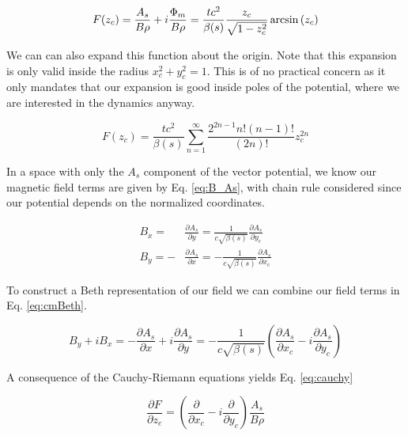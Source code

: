 \begin{equation} \label{eq:genF}
	F(z_c) = \frac{A_s}{B\rho} + i\frac{\Phi_m}{B\rho} = \frac{t c^2}{\beta(s)}\frac{z_c}{\sqrt{1-z_c^2}} \arcsin{(z_c)} \\ 
\end{equation}

We can can also expand this function about the origin. Note that this expansion is only valid inside the radius $x_c^2 + y_c^2 = 1$. This is of no practical concern as it only mandates that our expansion is good inside poles of the potential, where we are interested in the dynamics anyway.

\begin{equation} \label{eq:powF}
	F(z_c) = \frac{t c^2}{\beta(s)} \sum_{n=1}^{\infty} \frac{2^{2n-1}n!(n-1)!}{(2n)!} z_c^{2n}
\end{equation}

In a space with only the $A_s$ component of the vector potential, we know our magnetic field terms are given by Eq. \ref{eq:B_As}, with chain rule considered since our potential depends on the normalized coordinates.

\begin{equation} \label{eq:B_As}
\begin{split}
	B_x = &\frac{\partial A_s}{\partial y} = \frac{1}{c\sqrt{\beta(s)}}\frac{\partial A_s}{\partial y_c}\\
	B_y = -&\frac{\partial A_s}{\partial x} = -\frac{1}{c\sqrt{\beta(s)}}\frac{\partial A_s}{\partial x_c}
\end{split}
\end{equation}

To construct a Beth representation of our field we can combine our field terms in Eq. \ref{eq:cmBeth}.

\begin{equation} \label{eq:cmBeth}
	B_y + i B_x  = -\frac{\partial A_s}{\partial x} + i\frac{\partial A_s}{\partial y} = -\frac{1}{c\sqrt{\beta(s)}}\left(\frac{\partial A_s}{\partial x_c} - i\frac{\partial A_s}{\partial y_c}\right)
\end{equation}

A consequence of the Cauchy-Riemann equations yields Eq. \ref{eq:cauchy}

\begin{equation} \label{eq:cauchy}
	\frac{\partial F}{\partial z_c} = \left(\frac{\partial }{\partial x_c} - i\frac{\partial }{\partial y_c}\right) \frac{A_s}{B\rho}
\end{equation}

